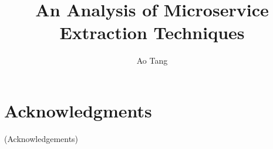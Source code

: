 \documentclass[10pt,conference]{IEEEtran}
\begin{document}
\title{An Analysis of Microservice Extraction Techniques}


\author{Ao Tang}




 



\maketitle










\section{Acknowledgments}
\label{sec:ack}
(Acknowledgements)


\balance
%


\end{document}
